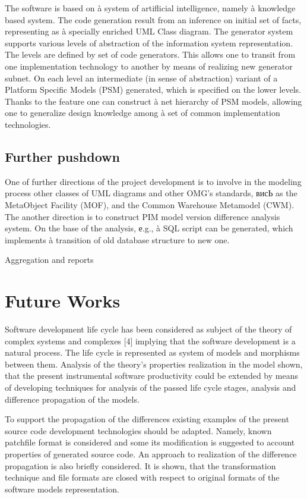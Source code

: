\documentclass{intech}
\begin{document}
The software is based on à system of artiflicial intelligence, namely à knowledge based system. The code generation result from an inference on initial set of facts, representing as à specially enriched UML Class diagram. The generator system supports various levels of abstraction of the information system representation. The levels are defined by set of code generators. This allows one to transit from one implementation technology to another by means of realizing new generator subnet. On each level an intermediate (in sense of abstraction) variant of a Platform Specific Models (PSM) generated, which is specified on the lower levels. Thanks to the feature one can construct à net hierarchy of PSM models, allowing one to generalize design knowledge among à set of common implementation technologies.

\subsection{Further pushdown}

One of further directions of the project development is to involve in the modeling process other classes of UML diagrams and other OMG's standards, висЬ as the MetaObject Facility (MOF), and the Common Warehouse Metamodel (CWM). The another direction is to construct PIM model version difference analysis system. On the base of the analysis, е.g., à SQL script can be generated, which implements à transition of old database structure to new one.

Aggregation and reports

\section{Future Works}

Software development life cycle has been considered as subject of the theory of complex systems and complexes [4] implying that the software development is a natural process. The life cycle is represented as system of models and morphisms between them. Analysis of the theory’s properties realization in the model shown, that the present instrumental software productivity could be extended by means of developing techniques for analysis of the passed life cycle stages, analysis and difference propagation of the models.

To support the propagation of the differences existing examples of the present source code development technologies should be adapted. Namely, known patchfile format is considered and some its modification is suggested to account properties of generated source code. An approach to realization of the difference propagation is also briefly considered. It is shown, that the transformation technique and file formats are closed with respect to original formats of the software models representation.
\end{document}
